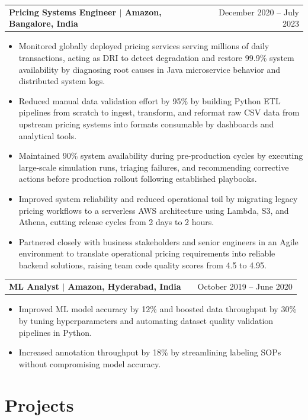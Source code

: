 \documentclass[a4paper,10.5pt]{article} %
\makeatletter
\newenvironment{joblong}[2]{
  \begin{tabularx}{\linewidth}{@{}l X r@{}}
  \textbf{#1} & & #2 \\
  \end{tabularx}
  \vspace{-15pt}
  \begin{itemize}[nosep, leftmargin=1em, itemsep=3pt,label=$\bullet$]
}{\end{itemize}}
\makeatother
\begin{document}
\begin{joblong}{Pricing Systems Engineer $|$ Amazon, Bangalore, India}{December 2020 -- July 2023}
\item Monitored globally deployed pricing services serving millions of daily 
transactions, acting as DRI to detect degradation and restore 99.9\% system 
availability by diagnosing root causes in Java microservice behavior and 
distributed system logs.
\item Reduced manual data validation effort by 95\% by building Python ETL pipelines from scratch to ingest, transform, and reformat raw CSV data from upstream pricing systems into formats consumable by dashboards and analytical tools.
\item Maintained 90\% system availability during pre-production cycles by 
executing large-scale simulation runs, triaging failures, and recommending 
corrective actions before production rollout following established playbooks.
\item Improved system reliability and reduced operational toil by migrating 
legacy pricing workflows to a serverless AWS architecture using Lambda, S3, 
and Athena, cutting release cycles from 2 days to 2 hours.
\item Partnered closely with business stakeholders and senior engineers in 
an Agile environment to translate operational pricing requirements into 
reliable backend solutions, raising team code quality scores from 4.5 to 4.95.

\end{joblong}

\begin{joblong}{ML Analyst $|$ Amazon, Hyderabad, India}{October 2019 -- June 2020}
\item Improved ML model accuracy by 12\% and boosted data throughput by 30\% by tuning hyperparameters and automating dataset quality validation pipelines in Python.
\item Increased annotation throughput by 18\% by streamlining labeling SOPs without compromising model accuracy.


\end{joblong}


\section*{Projects}
\end{document}
